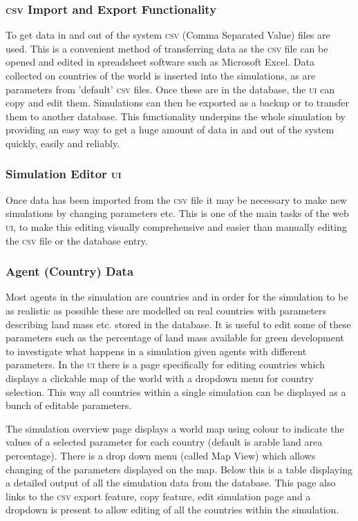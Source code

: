 \subsubsection{\textsc{csv} Import and Export Functionality}

To get data in and out of the system \textsc{csv} (Comma Separated Value) files are used. This is a convenient method of transferring data as the \textsc{csv} file can be opened and edited in spreadsheet software such as Microsoft Excel. Data collected on countries of the world is inserted into the simulations, as are parameters from 'default' \textsc{csv} files. Once these are in the database, the \textsc{ui} can copy and edit them. Simulations can then be exported as a backup or to transfer them to another database. This functionality underpins the whole simulation by providing an easy way to get a huge amount of data in and out of the system quickly, easily and reliably.

\subsubsection{Simulation Editor \textsc{ui}}

Once data has been imported from the \textsc{csv} file it may be necessary to make new simulations by changing parameters etc. This is one of the main tasks of the web \textsc{ui}, to make this editing visually comprehensive and easier than manually editing the \textsc{csv} file or the database entry.

\subsubsection{Agent (Country) Data}

Most agents in the simulation are countries and in order for the simulation to be as realistic as possible these are modelled on real countries with parameters describing land mass etc. stored in the database. It is useful to edit some of these parameters such as the percentage of land mass available for green development to investigate what happens in a simulation given agents with different parameters. In the \textsc{ui} there is a page specifically for editing countries which displays a clickable map of the world with a dropdown menu for country selection. This way all countries within a single simulation can be displayed as a bunch of editable parameters.


The simulation overview page displays a world map using colour to indicate the values of a selected parameter for each country (default is arable land area percentage). There is a drop down menu (called Map View) which allows changing of the parameters displayed on the map. Below this is a table displaying a detailed output of all the simulation data from the database. This page also links to the \textsc{csv} export feature, copy feature, edit simulation page and a dropdown is present to allow editing of all the countries within the simulation.

